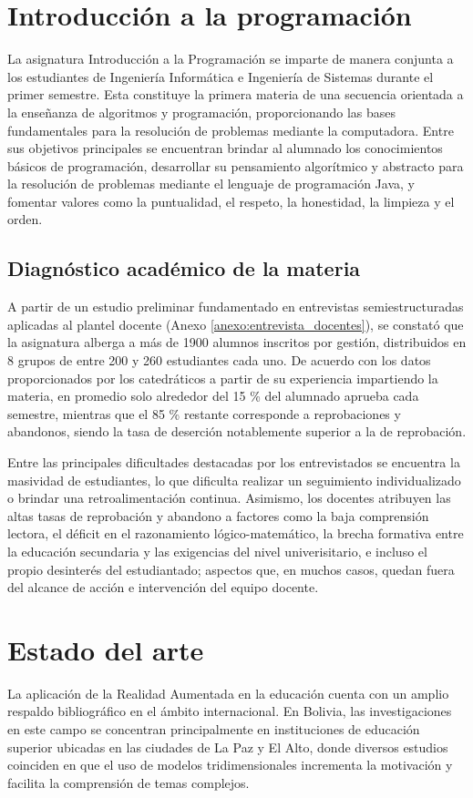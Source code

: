 \section{Introducción a la programación}
La asignatura Introducción a la Programación se imparte de manera conjunta a los 
estudiantes de Ingeniería Informática e Ingeniería de Sistemas durante el primer 
semestre. Esta constituye la primera materia de una secuencia orientada a la 
enseñanza de algoritmos y programación, proporcionando las bases fundamentales 
para la resolución de problemas mediante la computadora. Entre sus objetivos 
principales se encuentran brindar al alumnado los conocimientos básicos de 
programación, desarrollar su pensamiento algorítmico y abstracto para la 
resolución de problemas mediante el lenguaje de programación Java, y fomentar 
valores como la puntualidad, el respeto, la honestidad, la limpieza y el orden.
\parencite{cs2026}\vspace{1.15em}

\subsection{Diagnóstico académico de la materia}
A partir de un estudio preliminar fundamentado en entrevistas semiestructuradas 
aplicadas al plantel docente (Anexo \ref{anexo:entrevista_docentes}), se 
constató que la asignatura alberga a más de 1900 alumnos inscritos por 
gestión, distribuidos en 8 grupos de entre 200 y 260 estudiantes cada uno. 
De acuerdo con los datos proporcionados por los catedráticos a partir de su 
experiencia impartiendo la materia, en promedio solo alrededor del 15 \% del 
alumnado aprueba cada semestre, mientras que el 85 \% restante corresponde a 
reprobaciones y abandonos, siendo la tasa de deserción notablemente superior 
a la de reprobación.

Entre las principales dificultades destacadas por los entrevistados se 
encuentra la masividad de estudiantes, lo que dificulta realizar un seguimiento 
individualizado o brindar una retroalimentación continua. Asimismo, los 
docentes atribuyen las altas tasas de reprobación y abandono a factores como la 
baja comprensión lectora, el déficit en el razonamiento lógico-matemático, la 
brecha formativa entre la educación secundaria y las exigencias del nivel 
univerisitario, e incluso el propio desinterés del estudiantado; aspectos que, 
en muchos casos, quedan fuera del alcance de acción e intervención del equipo 
docente.

\section{Estado del arte}
La aplicación de la Realidad Aumentada en la educación cuenta con un amplio 
respaldo bibliográfico en el ámbito internacional. En Bolivia, las 
investigaciones en este campo se concentran principalmente en instituciones de 
educación superior ubicadas en las ciudades de La Paz y El Alto, donde diversos 
estudios coinciden en que el uso de modelos tridimensionales incrementa la 
motivación y facilita la comprensión de temas complejos. 

